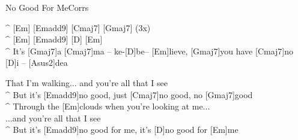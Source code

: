 \begin{song}{No Good For Me}{Corrs}

\begin{guitar}
^ [Em] [Emadd9] [Cmaj7] [Gmaj7]\hspace{1cm} (3x)\\
^ [Em] [Emadd9] [D] [Em]\\
^ It's [Gmaj7]a [Cmaj7]ma – ke-[D]be– [Em]lieve, [Gmaj7]you have [Cmaj7]no [D]i – [Asus2]dea\\
\end{guitar}

\begin{guitar}
That I'm walking... and you're all that I see\\
^ But it's [Emadd9]no good, just [Cmaj7]no good, no [Gmaj7]good\\
^ Through the [Em]clouds when you're looking at me...\\
...and you're all that I see\\
^ But it's [Emadd9]no good for me, it's [D]no good for [Em]me\\
\end{guitar}
\end{song}
